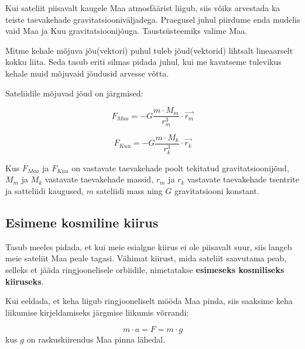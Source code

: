 \begin{flushleft}
Kui sateliit piisavalt kaugele Maa atmosfäärist liigub, siis võiks arvestada ka teiste taevakehade gravitatsiooniväljadega. Praegusel juhul piirdume enda mudelis vaid Maa ja Kuu gravitatsioonijõuga. Taustsüsteemiks valime Maa.

\vspace{5mm}
Mitme kehale mõjuva jõu(vektori) puhul tuleb jõud(vektorid) lihtsalt lineaarselt kokku liita. Seda tasub eriti silmas pidada juhul, kui me kavatseme tulevikus kehale muid mõjuvaid jõudusid arvesse võtta.

\vspace{5mm}
Sateliidile mõjuvad jõud on järgmised:

\begin{equation}
\label{eq3_1}
F_{Maa}=-G\dfrac{m \cdot M_{m}}{r_{m}^{3}}\cdot \vec{r_{m}}
\end{equation}

\begin{equation}
\label{eq3_2}
F_{Kuu}=-G\dfrac{m \cdot M_{k}}{r_{k}^{3}}\cdot \vec{r_{k}}
\end{equation}


Kus $F_{Maa}$ ja $F_{Kuu}$ on vastavate taevakehade poolt tekitatud gravitatsioonijõud, $M_{m}$ ja $M_{k}$ vastavate taevakehade massid, $r_{m}$ ja $r_{k}$ vastavate taevakehade tsentrite ja satteliidi kaugused, $m$ sateliidi mass ning $G$ gravitatsiooni konstant.


\vspace{5mm}
\subsection{Esimene kosmiline kiirus}

\vspace{5mm}
Tasub meeles pidada, et kui meie esialgne kiirus ei ole piisavalt suur, siis langeb meie sateliit Maa peale tagasi. Vähimat kiirust, mida sateliit saavutama peab, selleks et jääda ringjoonelisele orbiidile, nimetatakse \textbf{esimeseks kosmiliseks kiiruseks}.

\vspace{5mm}
Kui eeldada, et keha liigub ringjooneliselt mööda Maa pinda, siis saaksime keha liikumise kirjeldamiseks järgmise liikumis võrrandi: 

\begin{equation}
\label{eq3_3}
 m \cdot a =F=m\cdot g
\end{equation}
kus $g$ on raskuskiirendus Maa pinna lähedal.


\end{flushleft}
